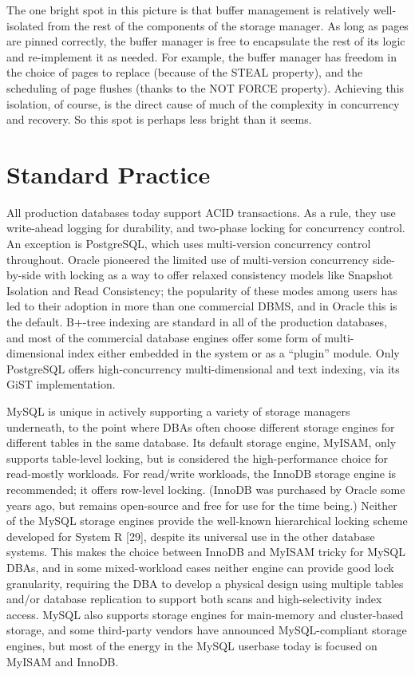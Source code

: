\documentclass[a4paper,11pt,twoside,openright]{book}
\begin{document}
The one bright spot in this picture is that buffer management is
relatively well-isolated from the rest of the components of the storage
manager. As long as pages are pinned correctly, the buffer manager is
free to encapsulate the rest of its logic and re-implement it as needed.
For example, the buffer manager has freedom in the choice of pages to
replace (because of the STEAL property), and the scheduling of page
flushes (thanks to the NOT FORCE property). Achieving this isolation, of
course, is the direct cause of much of the complexity in concurrency and
recovery. So this spot is perhaps less bright than it seems.

\hypertarget{standard-practice-4}{%
\section{Standard Practice}\label{standard-practice-4}}

All production databases today support ACID transactions. As a rule,
they use write-ahead logging for durability, and two-phase locking for
concurrency control. An exception is PostgreSQL, which uses
multi-version concurrency control throughout. Oracle pioneered the
limited use of multi-version concurrency side-by-side with locking as a
way to offer relaxed consistency models like Snapshot Isolation and Read
Consistency; the popularity of these modes among users has led to their
adoption in more than one commercial DBMS, and in Oracle this is the
default. B+-tree indexing are standard in all of the production
databases, and most of the commercial database engines offer some form
of multi-dimensional index either embedded in the system or as a
``plugin'' module. Only PostgreSQL offers high-concurrency
multi-dimensional and text indexing, via its GiST implementation.

MySQL is unique in actively supporting a variety of storage managers
underneath, to the point where DBAs often choose different storage
engines for different tables in the same database. Its default storage
engine, MyISAM, only supports table-level locking, but is considered the
high-performance choice for read-mostly workloads. For read/write
workloads, the InnoDB storage engine is recommended; it offers row-level
locking. (InnoDB was purchased by Oracle some years ago, but remains
open-source and free for use for the time being.) Neither of the MySQL
storage engines provide the well-known hierarchical locking scheme
developed for System R {[}29{]}, despite its universal use in the other
database systems. This makes the choice between InnoDB and MyISAM tricky
for MySQL DBAs, and in some mixed-workload cases neither engine can
provide good lock granularity, requiring the DBA to develop a physical
design using multiple tables and/or database replication to support both
scans and high-selectivity index access. MySQL also supports storage
engines for main-memory and cluster-based storage, and some third-party
vendors have announced MySQL-compliant storage engines, but most of the
energy in the MySQL userbase today is focused on MyISAM and InnoDB.
\end{document}
